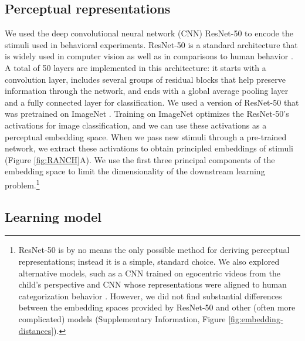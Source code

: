 \documentclass[
]{article}
\begin{document}
\hypertarget{perceptual-representations}{%
\subsection{Perceptual representations}\label{perceptual-representations}}

We used the deep convolutional neural network (CNN) ResNet-50 to encode the stimuli used in behavioral experiments. ResNet-50 is a standard architecture that is widely used in computer vision as well as in comparisons to human behavior \autocite{he2016deep,lee2023empirical}. A total of 50 layers are implemented in this architecture: it starts with a convolution layer, includes several groups of residual blocks that help preserve information through the network, and ends with a global average pooling layer and a fully connected layer for classification. We used a version of ResNet-50 that was pretrained on ImageNet \autocite{deng2009imagenet}. Training on ImageNet optimizes the ResNet-50's activations for image classification, and we can use these activations as a perceptual embedding space. When we pass new stimuli through a pre-trained network, we extract these activations to obtain principled embeddings of stimuli (Figure \ref{fig:RANCH}A). We use the first three principal components of the embedding space to limit the dimensionality of the downstream learning problem.\footnote{ResNet-50 is by no means the only possible method for deriving perceptual representations; instead it is a simple, standard choice. We also explored alternative models, such as a CNN trained on egocentric videos from the child's perspective and CNN whose representations were aligned to human categorization behavior \autocite{orhan2024learning,lee2022rapid}. However, we did not find substantial differences between the embedding spaces provided by ResNet-50 and other (often more complicated) models (Supplementary Information, Figure \ref{fig:embedding-distances}).}

\hypertarget{learning-model}{%
\subsection{Learning model}\label{learning-model}}
\end{document}

